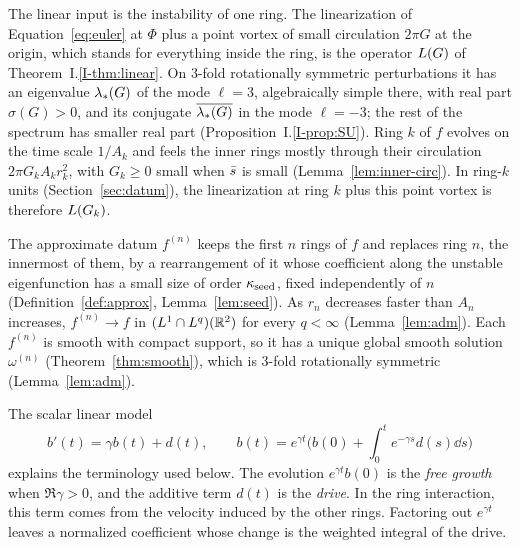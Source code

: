 The linear input is the instability of one ring. The linearization of
Equation~\eqref{eq:euler} at $\Phi$ plus a point vortex of small circulation
$2\pi G$ at the origin, which stands for everything inside the ring, is the
operator $L(G)$ of Theorem~I.\ref{I-thm:linear}. On $3$-fold rotationally
symmetric perturbations it has an eigenvalue $\lambda_*(G)$ of the mode $\ell=3$,
algebraically simple there, with real part $\sigma(G)>0$, and its conjugate
$\overline{\lambda_*(G)}$ in the mode $\ell=-3$; the rest of the spectrum has
smaller real part (Proposition~I.\ref{I-prop:SU}). Ring $k$ of $f$ evolves on
the time scale $1/A_k$ and feels the inner rings mostly through their
circulation $2\pi G_kA_kr_k^2$, with $G_k\ge0$ small when $\bar s$ is small
(Lemma~\ref{lem:inner-circ}). In ring-$k$ units (Section~\ref{sec:datum}), the linearization at
ring $k$ plus this point vortex is therefore $L(G_k)$.

The approximate datum $f^{(n)}$ keeps the first $n$ rings of $f$ and replaces
ring $n$, the innermost of them, by a rearrangement of it whose coefficient
along the unstable eigenfunction has a small size of order $\kappa_{\mathrm{seed}}$, fixed
independently of $n$ (Definition~\ref{def:approx}, Lemma~\ref{lem:seed}). As
$r_n$ decreases faster than $A_n$ increases, $f^{(n)}\to f$ in
$(L^1\cap L^q)(\mathbb{R}^2)$ for every $q<\infty$ (Lemma~\ref{lem:adm}). Each
$f^{(n)}$ is smooth with compact support, so it has a unique global smooth
solution $\omega^{(n)}$ (Theorem~\ref{thm:smooth}), which is $3$-fold
rotationally symmetric (Lemma~\ref{lem:adm}).

The scalar linear model
\[
b'(t)=\gamma b(t)+d(t),\qquad
b(t)=e^{\gamma t}\Big(b(0)+\int_0^t e^{-\gamma s}d(s)\dd s\Big)
\]
explains the terminology used below. The evolution $e^{\gamma t}b(0)$ is the
\emph{free growth} when $\Re\gamma>0$, and the additive term $d(t)$ is the
\emph{drive}. In the ring interaction, this term comes from the velocity
induced by the other rings. Factoring out $e^{\gamma t}$ leaves a normalized
coefficient whose change is the weighted integral of the drive.

